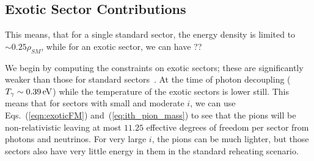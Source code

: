 \documentclass[nofootinbib,twocolumn,preprintnumbers]{revtex4-1}
\begin{document}
\subsection{Exotic Sector Contributions}


This means, that for a single standard sector, the energy density is limited to $\sim 0.25\rho_{SM}$, while for an exotic sector, we can have ??



We begin by computing the constraints on exotic sectors; these are significantly weaker than those for standard sectors~\cite{Arkani-Hamed:2016rle}. 
At the time of photon decoupling ($T_\gamma \sim 0.39 \,{\rm eV}$) while the temperature of the exotic sectors is lower still. This means that for sectors with small and moderate $i$, we can use Eqs.~(\ref{eqn:exoticFM}) and~(\ref{eq:ith_pion_mass}) to see that the pions will be non-relativistic  leaving at most $11.25$ effective degrees of freedom per sector from photons and neutrinos.  For very large $i$, the pions can be much lighter, but those sectors also have very little energy in them in the standard reheating scenario. 


\end{document}
